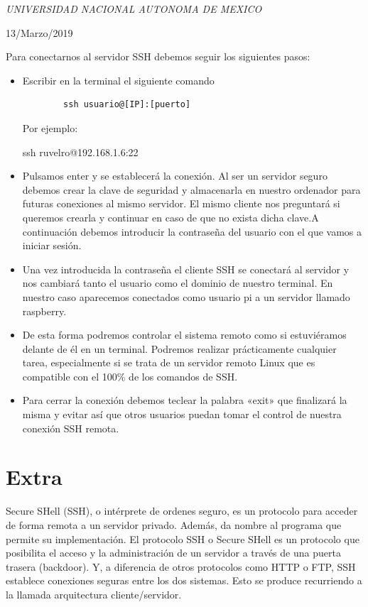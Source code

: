 \documentclass[a4paper, 11pt, oneside]{article}
\begin{document}
\begin{titlepage}
	\textit{UNIVERSIDAD NACIONAL AUTONOMA DE MEXICO} 
	
	\vfill
	
	
	
	
	\vspace{0.3\baselineskip} 
	
	13/Marzo/2019 
	
	 

\end{titlepage}
Para conectarnos al servidor SSH debemos seguir los siguientes pasos:
\begin{itemize}
    \item Escribir en la terminal el siguiente comando

    \begin{verbatim}
        ssh usuario@[IP]:[puerto]
    \end{verbatim}

    Por ejemplo:

    ssh ruvelro@192.168.1.6:22
    \item Pulsamos enter y se establecerá la conexión. Al ser un servidor seguro debemos crear la clave de seguridad y almacenarla en nuestro ordenador para futuras conexiones al mismo servidor. El mismo cliente nos preguntará si queremos crearla y continuar en caso de que no exista dicha clave.A continuación debemos introducir la contraseña del usuario con el que vamos a iniciar sesión.
    \item Una vez introducida la contraseña el cliente SSH se conectará al servidor y nos cambiará tanto el usuario como el dominio de nuestro terminal. En nuestro caso aparecemos conectados como usuario pi a un servidor llamado raspberry.
    \item De esta forma podremos controlar el sistema remoto como si estuviéramos delante de él en un terminal. Podremos realizar prácticamente cualquier tarea, especialmente si se trata de un servidor remoto Linux que es compatible con el 100\% de los comandos de SSH.
    \item Para cerrar la conexión debemos teclear la palabra «exit» que finalizará la misma y evitar así que otros usuarios puedan tomar el control de nuestra conexión SSH remota.

\end{itemize}
    \section*{Extra}
    Secure SHell (SSH), o intérprete de ordenes seguro, es un protocolo para acceder de forma remota a un servidor privado. Además, da nombre al programa que permite su implementación. El protocolo SSH o Secure SHell es un protocolo que posibilita el acceso y la administración de un servidor a través de una puerta trasera (backdoor). Y, a diferencia de otros protocolos como HTTP o FTP, SSH establece conexiones seguras entre los dos sistemas. Esto se produce recurriendo a la llamada arquitectura cliente/servidor.
\end{document}
